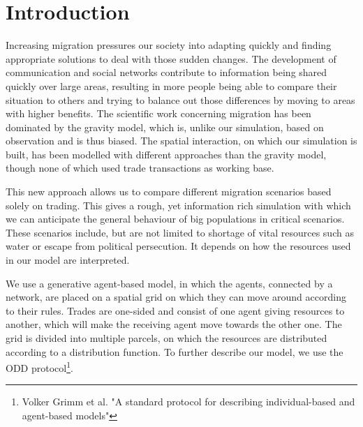 \documentclass{JASSS}
\begin{document}




\section{Introduction}
Increasing migration pressures our society into adapting quickly and finding appropriate solutions to deal with those sudden changes. The development of communication and social networks contribute to information being shared quickly over large areas, resulting in more people being able to compare their situation to others and trying to balance out those differences by moving to areas with higher benefits. The scientific work concerning migration has been dominated by the gravity model, which is, unlike our simulation, based on observation and is thus biased. The spatial interaction, on which our simulation is built, has been modelled with different approaches than the gravity model, though none of which used trade transactions as working base.

This new approach allows us to compare different migration scenarios based solely on trading. This gives a rough, yet information rich simulation with which we can anticipate the general behaviour of big populations in critical scenarios. These scenarios include, but are not limited to shortage of vital resources such as water or escape from political persecution. It depends on how the resources used in our model are interpreted.

We use a generative agent-based model, in which the agents, connected by a network, are placed on a spatial grid on which they can move around according to their rules. Trades are one-sided and consist of one agent giving resources to another, which will make the receiving agent move towards the other one. The grid is divided into multiple parcels, on which the resources are distributed according to a distribution function. To further describe our model, we use the ODD protocol\footnote{Volker Grimm et al. "A standard protocol for describing individual-based and agent-based models"}.
\end{document}
